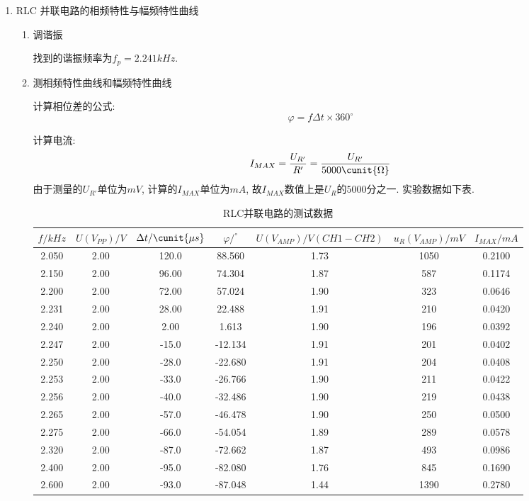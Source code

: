 \documentclass[11pt]{article}
\begin{document}
\begin{enumerate}
\begin{enumerate}
    \end{enumerate}

    \item RLC 并联电路的相频特性与幅频特性曲线
    
    \begin{enumerate}

    \item 调谐振
    
    找到的谐振频率为$f_p= 2.241\unit{kHz}$.

    \item 测相频特性曲线和幅频特性曲线
    
    计算相位差的公式:
    \[
        \varphi = f \Delta t \times 360^\circ
    \]

    计算电流:
    \[
        I_{MAX} = \frac{U_{R'}}{R'} =  \frac{U_{R'}}{5000\cunit{\Omega}}
    \]
    由于测量的$U_{R'}$单位为$\unit{mV}$, 计算的$I_{MAX}$单位为$\unit{mA}$, 故$I_{MAX}$数值上是$U_R$的$5000$分之一. 实验数据如下表.
    
    \begin{table}[H]
        \centering
        \caption{RLC并联电路的测试数据}
        \begin{tabular}{|c|c|c|c|c|c|c|}
            \hline
            $f/\unit{kHz}$&$U(V_{PP})/\unit{V}$&$\Delta t/ \cunit{\mu s}$&$\varphi /^{\circ}$&$U(V_{AMP})/\unit{V(CH1-CH2)}$&$u_R(V_{AMP})/\unit{mV}$&$I_{MAX}/\unit{mA}$\\
            \hline
            2.050&2.00&120.0&88.560&1.73&1050&0.2100\\
            \hline
            2.150&2.00&96.00&74.304&1.87&587&0.1174\\
            \hline
            2.200&2.00&72.00&57.024&1.90&323&0.0646\\
            \hline
            2.231&2.00&28.00&22.488&1.91&210&0.0420\\
            \hline
            2.240&2.00&2.00&1.613&1.90&196&0.0392\\
            \hline
            2.247&2.00&-15.0&-12.134&1.91&201&0.0402\\
            \hline
            2.250&2.00&-28.0&-22.680&1.91&204&0.0408\\
            \hline
            2.253&2.00&-33.0&-26.766&1.90&211&0.0422\\
            \hline
            2.256&2.00&-40.0&-32.486&1.90&219&0.0438\\
            \hline
            2.265&2.00&-57.0&-46.478&1.90&250&0.0500\\
            \hline
            2.275&2.00&-66.0&-54.054&1.89&289&0.0578\\
            \hline
            2.320&2.00&-87.0&-72.662&1.87&493&0.0986\\
            \hline
            2.400&2.00&-95.0&-82.080&1.76&845&0.1690\\
            \hline
            2.600&2.00&-93.0&-87.048&1.44&1390&0.2780\\
            \hline
        \end{tabular}
    \end{table}


\end{enumerate}
\end{enumerate}
\end{document}
